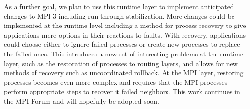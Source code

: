 \documentclass{llncs}
\begin{document}
As a further goal, we plan to use this runtime layer to implement
anticipated changes to MPI 3 including run-through stabilization. More
changes could be implemented at the runtime level including a method
for process recovery to give applications more options in their
reactions to faults. With recovery, applications could choose either
to ignore failed processes or create new processes to replace the
failed ones. This introduces a new set of interesting problems at the
runtime layer, such as the restoration of processes to routing layers,
and allows for new methods of recovery such as uncoordinated
rollback. At the MPI layer, restoring processes becomes even more
complex and requires that the MPI processes perform appropriate steps
to recover it failed neighbors. This work continues in the MPI Forum
and will hopefully be adopted soon.



\end{document}
